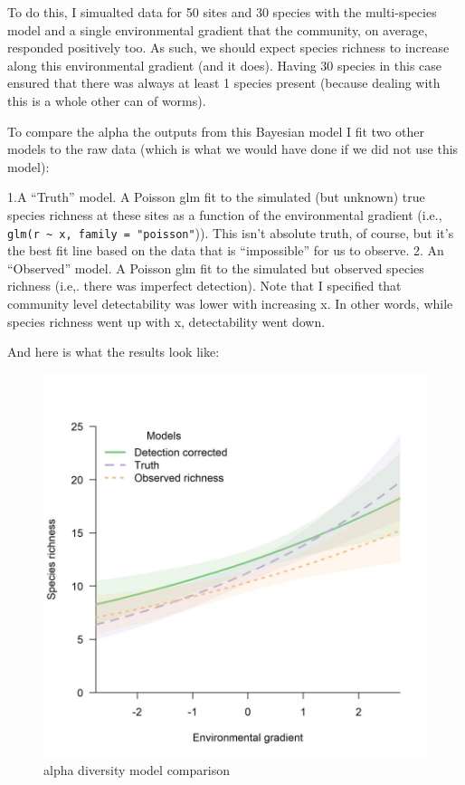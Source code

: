 \documentclass[
]{article}
\begin{document}
To do this, I simualted data for 50 sites and 30 species with the
multi-species model and a single environmental gradient that the
community, on average, responded positively too. As such, we should
expect species richness to increase along this environmental gradient
(and it does). Having 30 species in this case ensured that there was
always at least 1 species present (because dealing with this is a whole
other can of worms).

To compare the alpha the outputs from this Bayesian model I fit two
other models to the raw data (which is what we would have done if we did
not use this model):

1.A ``Truth'' model. A Poisson glm fit to the simulated (but unknown)
true species richness at these sites as a function of the environmental
gradient (i.e.,
\texttt{glm(r\ \textasciitilde{}\ x,\ family\ =\ "poisson"})). This
isn't absolute truth, of course, but it's the best fit line based on the
data that is ``impossible'' for us to observe. 2. An ``Observed'' model.
A Poisson glm fit to the simulated but observed species richness (i.e,.
there was imperfect detection). Note that I specified that community
level detectability was lower with increasing x. In other words, while
species richness went up with x, detectability went down.

And here is what the results look like:

\begin{figure}
\centering
\includegraphics{"alpha_comparison.jpeg"}
\caption{alpha diversity model comparison}
\end{figure}
\end{document}
